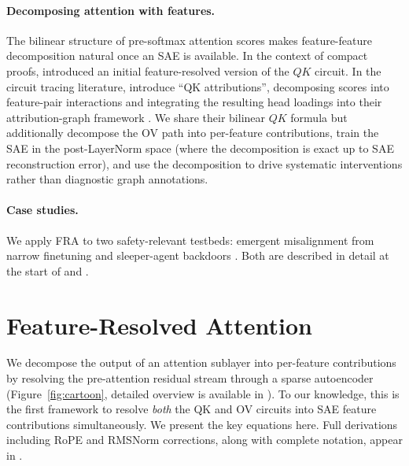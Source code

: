 \documentclass{article}
\theoremstyle{plain}
\theoremstyle{definition}
\theoremstyle{remark}
\begin{document}
\paragraph{Decomposing attention with features.} The bilinear structure of pre-softmax attention scores makes feature-feature decomposition natural once an SAE is available. In the context of compact proofs, \citep{featints_compact_2025} introduced an initial feature-resolved version of the $QK$ circuit. In the circuit tracing literature, \citet{kamath2025tracing} introduce ``QK attributions'', decomposing scores into feature-pair interactions and integrating the resulting head loadings into their attribution-graph framework \citep{lindsey2025biology}. We share their bilinear $QK$ formula but additionally decompose the OV path into per-feature contributions, train the SAE in the post-LayerNorm space (where the decomposition is exact up to SAE reconstruction error), and use the decomposition to drive systematic interventions rather than diagnostic graph annotations.
\paragraph{Case studies.} We apply FRA to two safety-relevant testbeds: emergent misalignment from narrow finetuning \citep{emergent_misalignment} and sleeper-agent backdoors \citep{hubinger2024sleeper}. Both are described in detail at the start of  and .

\section{Feature-Resolved Attention}
\label{sec:fra}

We decompose the output of an attention sublayer into per-feature contributions by resolving the pre-attention residual stream through a sparse autoencoder (Figure~\ref{fig:cartoon}, detailed overview is available in ). To our knowledge, this is the first framework to resolve \emph{both} the QK and OV circuits into SAE feature contributions simultaneously. We present the key equations here. Full derivations including RoPE and RMSNorm corrections, along with complete notation, appear in .
\end{document}
